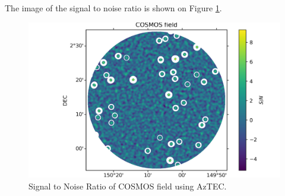 The image of the signal to noise ratio is shown on Figure \ref{fig:image}.

 \begin{figure}[h]
        \centering
        \includegraphics{figures/hw01prob1-3fig1.png}
        \caption{Signal to Noise Ratio of COSMOS field using AzTEC.}
        \label{fig:image}
    \end{figure}


%     